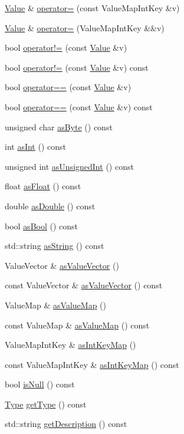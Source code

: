 \begin{DoxyCompactItemize}
\hyperlink{classValue}{Value} \& \hyperlink{classValue_ae8d5985e470633e8f87294cb3b8f8e75}{operator=} (const Value\+Map\+Int\+Key \&v)
\item 
\hyperlink{classValue}{Value} \& \hyperlink{classValue_a666a09f4702d0657f118fd0a15ba283c}{operator=} (Value\+Map\+Int\+Key \&\&v)
\item 
bool \hyperlink{classValue_aa790fa6ea9b22f72910403872b67dae4}{operator!=} (const \hyperlink{classValue}{Value} \&v)
\item 
bool \hyperlink{classValue_a33fc4197bb9458f053f7e8ee09716314}{operator!=} (const \hyperlink{classValue}{Value} \&v) const
\item 
bool \hyperlink{classValue_a27c03465fa8c9c2f54276679bb20094f}{operator==} (const \hyperlink{classValue}{Value} \&v)
\item 
bool \hyperlink{classValue_a9d9a4e78b513f3711060a5adeb044063}{operator==} (const \hyperlink{classValue}{Value} \&v) const
\item 
unsigned char \hyperlink{classValue_a67db4775eb08b887620175e2780ac061}{as\+Byte} () const
\item 
int \hyperlink{classValue_ae2982ec4babf8754de5bcb2842f5127d}{as\+Int} () const
\item 
unsigned int \hyperlink{classValue_af7d3b1f00d25385ce608c3e7b6363f7b}{as\+Unsigned\+Int} () const
\item 
float \hyperlink{classValue_a5caa49c1bfacb7bd667e1fc0725cd737}{as\+Float} () const
\item 
double \hyperlink{classValue_abf6f3457cc800530c5a60bf2990ab6a7}{as\+Double} () const
\item 
bool \hyperlink{classValue_a3f49bd86a14537ca63f59297513e80eb}{as\+Bool} () const
\item 
std\+::string \hyperlink{classValue_af2125ceb5eb007b6cd6ab77666682117}{as\+String} () const
\item 
Value\+Vector \& \hyperlink{classValue_a487d044b1073ff7ea4c5b8a47ff393ca}{as\+Value\+Vector} ()
\item 
const Value\+Vector \& \hyperlink{classValue_a658fe03730cb05f24e1685f4f6aa4f9e}{as\+Value\+Vector} () const
\item 
Value\+Map \& \hyperlink{classValue_a4f3c384baf951028907e09699d2bb4c9}{as\+Value\+Map} ()
\item 
const Value\+Map \& \hyperlink{classValue_a4871470948dd04992ed21956f1a0f8fe}{as\+Value\+Map} () const
\item 
Value\+Map\+Int\+Key \& \hyperlink{classValue_a9876cd521ce9669d60722bc2ac515af2}{as\+Int\+Key\+Map} ()
\item 
const Value\+Map\+Int\+Key \& \hyperlink{classValue_a4d0c55fe89b4b63a3da652a40f06cd26}{as\+Int\+Key\+Map} () const
\item 
bool \hyperlink{classValue_a920e68dea455df1b5857cd93790ff98a}{is\+Null} () const
\item 
\hyperlink{classValue_a669e0b7bc64c01dbec39297930398541}{Type} \hyperlink{classValue_a47f2fcdd9f53f9066190f2034078cc10}{get\+Type} () const
\item 
std\+::string \hyperlink{classValue_af1c0374c880e1543ff000bc6103c4441}{get\+Description} () const
\end{DoxyCompactItemize}
